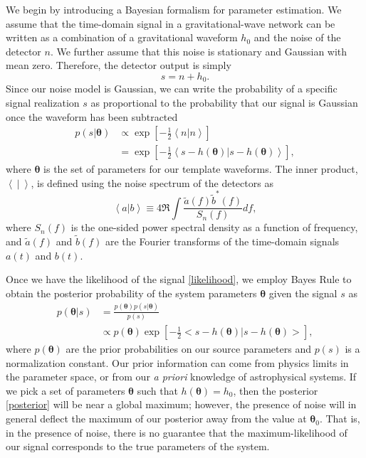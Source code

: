 \documentclass[11pt,a4paper]{emulateapj}
\newcommand{\thpara}{\boldsymbol{\theta}}
\begin{document}
We begin by introducing a Bayesian formalism for parameter estimation. 
We assume that the time-domain signal in a gravitational-wave
network can be written as a combination of a gravitational
waveform $h_0$ and the noise of the detector $n$.  We further assume
that this noise is stationary and Gaussian with mean zero.  Therefore,
the detector output is simply
\begin{equation}
s = n + h_0 .
\label{SignalAddition}
\end{equation}
Since our noise model is Gaussian, we can write the
probability of a specific signal realization $s$ as proportional to the probability
that our signal is Gaussian once the waveform has been subtracted
\begin{align}
  p(s | \thpara) &\propto \exp\left[-\frac{1}{2}\left<n|n
    \right>\right] \nonumber \\ &= \exp\left[-\frac{1}{2}\left < s -
    h(\thpara) | s-h(\thpara)\right >\right] ,
  \label{likelihood}
\end{align}
where $\thpara$ is the set of parameters for our template
waveforms.  The inner product, $\left< ~|~ \right> $, is defined using the noise
spectrum of the detectors as
\begin{equation}
  \left<a|b\right> \equiv 4 \Re \int \frac{\tilde{a}(f)\tilde{b}^*(f)}{S_n(f)} df ,
  \label{innerProduct}
\end{equation}
where $S_n(f)$ is the one-sided power spectral density as a function
of frequency, and $\tilde{a}(f)$ and $\tilde{b}(f)$ are the Fourier
transforms of the time-domain signals $a(t)$ and $b(t)$.
 
Once we have the likelihood of the signal \eqref{likelihood}, we
employ Bayes Rule to obtain the posterior probability of the system
parameters $\thpara$ given the signal $s$ as
\begin{align}
  p(\thpara | s) &= \frac{p(\thpara)p(s | \thpara)}{p(s)} \nonumber\\
  & \propto p(\thpara) \exp\left[-\frac{1}{2}\big < s - h(\thpara) | s-h(\thpara) \big > \right] ,
  \label{posterior}
\end{align}
where $p(\thpara)$ are the prior probabilities on our
source parameters and $p(s)$ is a normalization constant.  Our prior
information can come from physics limits in the parameter space, or
from our \textit{a priori} knowledge of astrophysical systems. If we
pick a set of parameters $\thpara$ such that
$h(\thpara) = h_0$, then the posterior \eqref{posterior}
will be near a global maximum; however, the presence of noise will in
general deflect the maximum of our posterior away from the value at
$\thpara_0$. That is, in the presence of noise, there is
no guarantee that the maximum-likelihood of our signal corresponds to
the true parameters of the system.  
\end{document}
